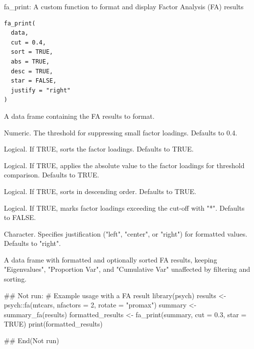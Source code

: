 \documentclass[a4paper]{book}
\begin{document}
%
\begin{Description}
fa\_print: A custom function to format and display Factor Analysis (FA) results
\end{Description}
%
\begin{Usage}
\begin{verbatim}
fa_print(
  data,
  cut = 0.4,
  sort = TRUE,
  abs = TRUE,
  desc = TRUE,
  star = FALSE,
  justify = "right"
)
\end{verbatim}
\end{Usage}
%
\begin{Arguments}
\begin{ldescription}
\item[\code{data}] A data frame containing the FA results to format.

\item[\code{cut}] Numeric. The threshold for suppressing small factor loadings. Defaults to 0.4.

\item[\code{sort}] Logical. If TRUE, sorts the factor loadings. Defaults to TRUE.

\item[\code{abs}] Logical. If TRUE, applies the absolute value to the factor loadings for threshold comparison. Defaults to TRUE.

\item[\code{desc}] Logical. If TRUE, sorts in descending order. Defaults to TRUE.

\item[\code{star}] Logical. If TRUE, marks factor loadings exceeding the cut-off with "*". Defaults to FALSE.

\item[\code{justify}] Character. Specifies justification ("left", "center", or "right") for formatted values. Defaults to "right".
\end{ldescription}
\end{Arguments}
%
\begin{Value}
A data frame with formatted and optionally sorted FA results, keeping "Eigenvalues",
"Proportion Var", and "Cumulative Var" unaffected by filtering and sorting.
\end{Value}
%
\begin{Examples}
\begin{ExampleCode}
\#\# Not run: 
# Example usage with a FA result
library(psych)
results <- psych::fa(mtcars, nfactors = 2, rotate = "promax")
summary <- summary_fa(results)
formatted_results <- fa_print(summary, cut = 0.3, star = TRUE)
print(formatted_results)

## End(Not run)
\end{ExampleCode}
\end{Examples}
\end{document}
